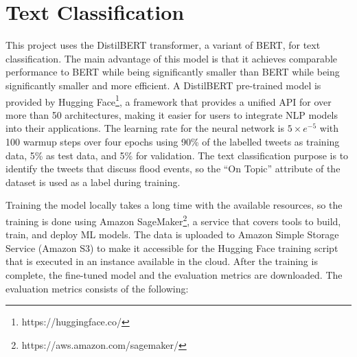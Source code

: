 \section{Text Classification}\label{sec:text_classification_section}

This project uses the DistilBERT transformer\cite{Sanh2019DistilBERTAD}, a variant of \ac{BERT}, for text
classification.  The main advantage of this model is that it achieves comparable performance to BERT
while being significantly smaller than BERT while being significantly smaller and more efficient. A
DistilBERT pre-trained model is provided by Hugging Face\footnote{https://huggingface.co/}, a
framework that provides a unified API for over more than 50 architectures, making it easier for
users to integrate \ac{NLP} models into their applications. The learning rate for the neural network
is $5\times e^{-5}$ with 100 warmup steps over four epochs using 90\% of the labelled tweets as
training data, 5\% as test data, and 5\% for validation. The text classification purpose is to
identify the tweets that discuss flood events, so the ``On Topic'' attribute of the dataset is used
as a label during training. 

Training the model locally takes a long time with the available resources, so the training is done
using Amazon SageMaker\footnote{https://aws.amazon.com/sagemaker/}, a service that covers tools to
build, train, and deploy \ac{ML} models. The data is uploaded to Amazon Simple Storage Service
(Amazon S3) to make it accessible for the Hugging Face training script that is executed in an
instance available in the cloud. After the training is complete, the fine-tuned model and the
evaluation metrics are downloaded. The evaluation metrics consists of the following:


